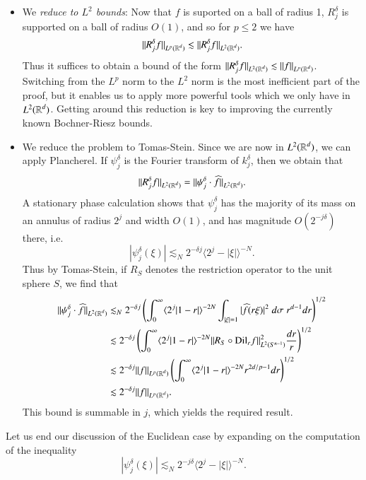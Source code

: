 \begin{itemize}
    \item We \emph{reduce to $L^2$ bounds}: Now that $f$ is suported on a ball of radius 1, $R^\delta_j$ is supported on a ball of radius $O(1)$, and so for $p \leq 2$ we have
    \[ \| R^\delta_j f \|_{L^p(\operatorname{\mathbb{R}}^d)} \lesssim \| R^\delta_j f \|_{L^2(\operatorname{\mathbb{R}}^d)}. \]
    Thus it suffices to obtain a bound of the form $\| R^\delta_j f \|_{L^2(\operatorname{\mathbb{R}}^d)} \lesssim \| f \|_{L^p(\operatorname{\mathbb{R}}^d)}$. Switching from the $L^p$ norm to the $L^2$ norm is the most inefficient part of the proof, but it enables us to apply more powerful tools which we only have in $L^2(\operatorname{\mathbb{R}}^d)$. Getting around this reduction is key to improving the currently known Bochner-Riesz bounds.

    \item We reduce the problem to Tomas-Stein. Since we are now in $L^2(\operatorname{\mathbb{R}}^d)$, we can apply Plancherel. If $\psi^\delta_j$ is the Fourier transform of $k^\delta_j$, then we obtain that
    \[ \| R^\delta_j f \|_{L^2(\operatorname{\mathbb{R}}^d)} = \| \psi^\delta_j \cdot \widehat{f} \|_{L^2(\operatorname{\mathbb{R}}^d)}. \]
    A stationary phase calculation shows that $\psi^\delta_j$ has the majority of its mass on an annulus of radius $2^j$ and width $O(1)$, and has magnitude $O(2^{-j\delta})$ there, i.e.
    \[ |\psi^\delta_j(\xi)| \lesssim_N 2^{-\delta j} \langle 2^j - |\xi| \rangle^{-N}. \]
    Thus by Tomas-Stein, if $R_S$ denotes the restriction operator to the unit sphere $S$, we find that
    \begin{align*}
        \| \psi^\delta_j \cdot \widehat{f} \|_{L^2(\operatorname{\mathbb{R}}^d)} &\lesssim_N 2^{-\delta j} \left( \int_0^\infty \langle 2^j |1 - r| \rangle^{-2N} \int_{|\xi| = 1} |\widehat{f}(r \xi)|^2\; d\sigma\; r^{d-1} dr \right)^{1/2}\\
        &\lesssim 2^{-\delta j} \left( \int_0^\infty \langle 2^j |1 - r| \rangle^{-2N} \| R_S \circ \text{Dil}_r f \|^2_{L^2(S^{n-1})} \frac{dr}{r} \right)^{1/2}\\
        &\lesssim  2^{-\delta j} \| f \|_{L^p(\operatorname{\mathbb{R}}^d)} \left( \int_0^\infty \langle 2^j |1 - r| \rangle^{-2N}  r^{2d/p - 1} dr \right)^{1/2}\\
        &\lesssim 2^{-\delta j} \| f \|_{L^p(\operatorname{\mathbb{R}}^d)}.
    \end{align*}
    This bound is summable in $j$, which yields the required result.
\end{itemize}
%
Let us end our discussion of the Euclidean case by expanding on the computation of the inequality
%
\[ |\psi^\delta_j(\xi)| \lesssim_N 2^{-j \delta} \langle 2^j - |\xi| \rangle^{-N}. \]

